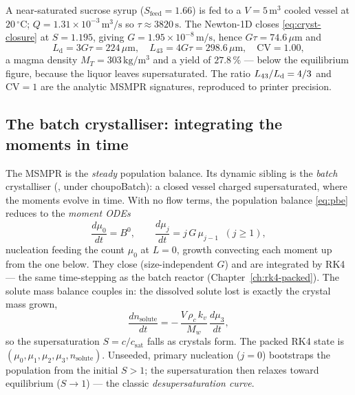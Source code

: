 \documentclass[11pt,a4paper]{article}
\begin{document}
\begin{example}
A near-saturated sucrose syrup ($S_{\text{feed}}=1.66$) is fed to a
$V=5\,\mathrm{m^3}$ cooled vessel at $20\,^\circ$C; $Q=1.31\times
10^{-3}\,\mathrm{m^3/s}$ so $\tau\approx 3820\,\mathrm{s}$.  The
Newton-1D closes \eqref{eq:cryst-closure} at $S=1.195$, giving
$G=1.95\times10^{-8}\,\mathrm{m/s}$, hence $G\tau=74.6\,\mu$m and
\[
   L_{\text{d}}=3G\tau=224\,\mu\mathrm{m},\quad
   L_{43}=4G\tau=298.6\,\mu\mathrm{m},\quad
   \mathrm{CV}=1.00,
\]
a magma density $M_T=303\,\mathrm{kg/m^3}$ and a yield of $27.8\,\%$
--- below the equilibrium figure, because the liquor leaves
supersaturated.  The ratio $L_{43}/L_{\text d}=4/3$ and
$\mathrm{CV}=1$ are the analytic MSMPR signatures, reproduced to
printer precision.
\end{example}

\subsection{The batch crystalliser: integrating the moments in time}

The MSMPR is the \emph{steady} population balance.  Its dynamic sibling
is the \emph{batch} crystalliser (, under
choupoBatch): a closed vessel charged supersaturated, where the
moments evolve in time.  With no flow terms, the population balance
\eqref{eq:pbe} reduces to the \emph{moment ODEs}
\begin{equation}
   \frac{d\mu_0}{dt} = B^0, \qquad
   \frac{d\mu_j}{dt} = j\,G\,\mu_{j-1}\;\;(j\ge 1),
   \label{eq:moment-odes}
\end{equation}
nucleation feeding the count $\mu_0$ at $L=0$, growth convecting each
moment up from the one below.  They close (size-independent $G$) and are
integrated by RK4 --- the same time-stepping as the batch reactor
(Chapter~\ref{ch:rk4-packed}).  The solute mass balance couples in: the
dissolved solute lost is exactly the crystal mass grown,
\begin{equation}
   \frac{dn_{\text{solute}}}{dt}
   = -\,\frac{V\,\rho_c\,k_v}{M_{w}}\,\frac{d\mu_3}{dt},
\end{equation}
so the supersaturation $S=c/c_{\text{sat}}$ falls as crystals form.
The packed RK4 state is $(\mu_0,\mu_1,\mu_2,\mu_3,n_{\text{solute}})$.
Unseeded, primary nucleation ($j=0$) bootstraps the population from the
initial $S>1$; the supersaturation then relaxes toward equilibrium
($S\to 1$) --- the classic \emph{desupersaturation curve}.
\end{document}
